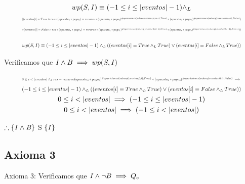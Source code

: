 \documentclass[10pt,a4paper]{article}
\begin{document}
\begin{equation}
    \begin{gathered}
        wp(S,{\it I}) \equiv (-1 \leq i \leq |eventos|-1) \yLuego \\
        \resizebox{.9\hsize}{!}{$((eventos[i]=True \land res*(apuesta_c*pago_c)=recurso*(apuesta_c*pago_c)^{\#apariciones(subseq (eventos,0,i+1),True)}*(apuesta_s * pago_s)^{\#apariciones(subseq(eventos,0,i+1),False)})$} \\
        \resizebox{.9\hsize}{!}{$\lor (eventos[i]=False \land res*(apuesta_s*pago_s)=recurso*(apuesta_c*pago_c)^{\#apariciones(subseq (eventos,0,i+1),True)}*(apuesta_s * pago_s)^{\#apariciones(subseq(eventos,0,i+1),False)}))$}\\
    \end{gathered}
\end{equation}

\begin{equation}
    \begin{gathered}
        \resizebox{.9\hsize}{!}{$wp(S,{\it I}) \equiv (-1 \leq i \leq |eventos|-1) \yLuego ((eventos[i]=True \yLuego True) \lor (eventos[i]=False \yLuego True))$}
    \end{gathered}
\end{equation}

Verificamos que ${\it I} \land B \implies wp(S,{\it I})$

\begin{equation}
    \begin{gathered}
        \resizebox{.9\hsize}{!}{$0 \leq i < |eventos| \yLuego res = recurso(apuesta_c * pago_c)^{\#apariciones(subseq(eventos,0,i),True)}*(apuesta_s * pago_s)^{\#apariciones(subseq(eventos,0,i),False)} \implies $}\\
        \resizebox{.9\hsize}{!}{$(-1 \leq i \leq |eventos|-1) \yLuego ((eventos[i]=True \yLuego True) \lor (eventos[i]=False \yLuego True))$} \\
        0 \leq i < |eventos| \implies (-1 \leq i \leq |eventos|-1) \\
        0 \leq i < |eventos| \implies (-1 \leq i < |eventos|)
    \end{gathered}
\end{equation}

$\therefore \{\it I \land B \}$ S $\{\it I \}$

\vspace{0.3cm}

\subsection{Axioma 3}
Axioma 3: Verificamos que ${\it I} \land \neg B \implies Q_c$
\end{document}
